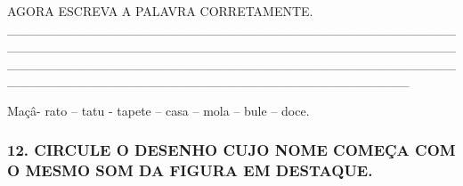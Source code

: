AGORA ESCREVA A PALAVRA CORRETAMENTE.
\_\_\_\_\_\_\_\_\_\_\_\_\_\_\_\_\_\_\_\_\_\_\_\_\_\_\_\_\_\_\_\_\_\_\_\_\_\_\_\_\_\_\_\_\_\_\_\_\_\_\_\_\_\_\_\_\_\_\_\_\_\_\_\_\_\_\_\_\_\_\_\_\_\_\_\_\_\_\_\_\_\_\_\_\_\_\_\_\_\_\_\_\_\_\_\_\_\_\_\_\_\_\_\_\_\_\_\_\_\_\_\_\_\_\_\_\_\_\_\_\_\_\_\_\_\_\_\_\_\_\_\_\_\_\_\_\_\_\_\_\_\_\_\_\_\_\_\_\_\_\_\_\_\_\_\_\_\_\_\_\_\_\_\_\_\_\_\_\_\_\_\_\_\_\_\_\_\_\_\_\_\_\_\_\_\_\_

Maçâ- rato -- tatu - tapete -- casa -- mola -- bule -- doce.

\subsubsection{12. CIRCULE O DESENHO CUJO NOME COMEÇA COM O MESMO SOM DA
FIGURA EM
DESTAQUE.}\label{circule-o-desenho-cujo-nome-comeuxe7a-com-o-mesmo-som-da-figura-em-destaque.}

